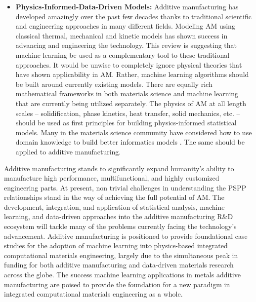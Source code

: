 \begin{itemize}
	\item \textbf{Physics-Informed-Data-Driven Models:} Additive manufacturing has developed amazingly over the past few decades thanks to traditional scientific and engineering approaches in many different fields. Modeling AM using classical thermal, mechanical and kinetic models has shown success in advancing and engineering the technology. This review is suggesting that machine learning be used as a complementary tool to these traditional approaches. It would be unwise to completely ignore physical theories that have shown applicability in AM. Rather, machine learning algorithms should be built around currently existing models. There are equally rich mathematical frameworks in both materials science and machine learning that are currently being utilized separately. The physics of AM at all length scales -- solidification, phase kinetics, heat transfer, solid mechanics, etc. -- should be used as first principles for building physics-informed statistical models. Many in the materials science community have considered how to use domain knowledge to build better informatics models \cite{Deaven1995, Morris1996, Wagner2016, Raccuglia2016}. The same should be applied to additive manufacturing.
\end{itemize}

Additive manufacturing stands to significantly expand humanity's ability to manufacture high performance, multifunctional, and highly customized engineering parts. At present, non trivial challenges in understanding the PSPP relationships stand in the way of achieving the full potential of AM. The development, integration, and application of statistical analysis, machine learning, and data-driven approaches into the additive manufacturing R\&D ecosystem will tackle many of the problems currently facing the technology's advancement. Additive manufacturing is positioned to provide foundational case studies for the adoption of machine learning into physics-based integrated computational materials engineering, largely due to the simultaneous peak in funding for both additive manufacturing and data-driven materials research across the globe. The success machine learning applications in metals additive manufacturing are poised to provide the foundation for a new paradigm in integrated computational materials engineering as a whole. 